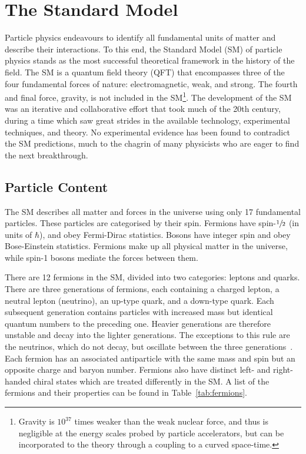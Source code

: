 \chapter{The Standard Model}
\label{chap:sm}

Particle physics endeavours to identify all fundamental units of matter and describe their interactions.
To this end, the Standard Model (SM) of particle physics stands as the most successful theoretical framework in the history of the field.
The SM is a quantum field theory (QFT) that encompasses three of the four fundamental forces of nature: electromagnetic, weak, and strong.
The fourth and final force, gravity, is not included in the SM\footnote{Gravity is $10^{37}$ times weaker than the weak nuclear force, and thus is negligible at the energy scales probed by particle accelerators, but can be incorporated to the theory through a coupling to a curved space-time.}.
The development of the SM was an iterative and collaborative effort that took much of the 20th century, during a time which saw great strides in the available technology, experimental techniques, and theory.
No experimental evidence has been found to contradict the SM predictions, much to the chagrin of many physicists who are eager to find the next breakthrough.

\section{Particle Content}

The SM describes all matter and forces in the universe using only 17 fundamental particles.
These particles are categorised by their spin.
Fermions have spin-$\sfrac{1}{2}$ (in units of $\hbar$), and obey Fermi-Dirac statistics.
Bosons have integer spin and obey Bose-Einstein statistics.
Fermions make up all physical matter in the universe, while spin-1 bosons mediate the forces between them.

There are 12 fermions in the SM, divided into two categories: leptons and quarks.
There are three generations of fermions, each containing a charged lepton, a neutral lepton (neutrino), an up-type quark, and a down-type quark.
Each subsequent generation contains particles with increased mass but identical quantum numbers to the preceding one.
Heavier generations are therefore unstable and decay into the lighter generations.
The exceptions to this rule are the neutrinos, which do not decay, but oscillate between the three generations~\cite{NeutrinoOsc}.
Each fermion has an associated antiparticle with the same mass and spin but an opposite charge and baryon number.
Fermions also have distinct left- and right-handed chiral states which are treated differently in the SM\@.
A list of the fermions and their properties can be found in Table~\ref{tab:fermions}.

